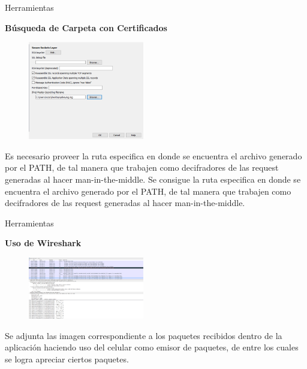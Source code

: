 \begin{frame}[t,fragile]{Herramientas}

\textbf{Búsqueda de Carpeta con Certificados }

\begin{figure} 
\vspace{2pt}
  \begin{center}
    \includegraphics[width=0.45\textwidth]{archivossllog.png}
    \label{fig:databaseUserTable}
  \end{center}
  \vspace{2pt}
\end{figure} 

\bigskip

Es necesario proveer la ruta especifica en donde se encuentra el archivo generado por el PATH, de tal manera que trabajen como decifradores de las request generadas al hacer man-in-the-middle.
Se consigue la ruta especifica en donde se encuentra el archivo generado por el PATH, de tal manera que trabajen como decifradores de las request generadas al hacer man-in-the-middle.



\end{frame}



\begin{frame}[t,fragile]{Herramientas}

\textbf{Uso de Wireshark}

\begin{figure} 
\vspace{2pt}
  \begin{center}
    \includegraphics[width=0.45\textwidth]{paqueteswiressl.png}
    \label{fig:databaseUserTable}
  \end{center}
  \vspace{2pt}
\end{figure} 

\bigskip

Se adjunta las imagen correspondiente a los paquetes recibidos dentro de la aplicación haciendo uso del celular como emisor de paquetes, de entre los cuales se logra apreciar ciertos paquetes.


\end{frame}


